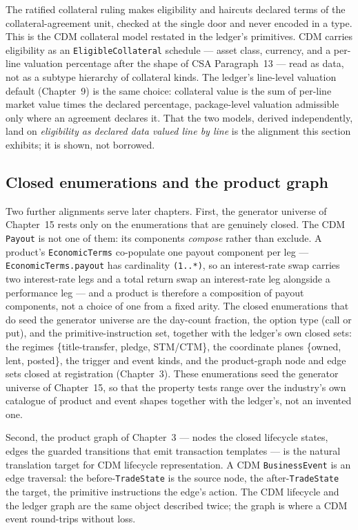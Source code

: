 The ratified collateral ruling makes eligibility and haircuts declared terms of
the collateral-agreement unit, checked at the single door and never encoded in a
type. This is the CDM collateral model restated in the ledger's primitives. CDM
carries eligibility as an \texttt{EligibleCollateral} schedule --- asset class,
currency, and a per-line valuation percentage after the shape of CSA
Paragraph~13 --- read as data, not as a subtype hierarchy of collateral kinds.
The ledger's line-level valuation default (Chapter~9) is the same choice:
collateral value is the sum of per-line market value times the declared
percentage, package-level valuation admissible only where an agreement declares
it. That the two models, derived independently, land on \emph{eligibility as
declared data valued line by line} is the alignment this section exhibits; it is
shown, not borrowed.

\subsection{Closed enumerations and the product graph}

Two further alignments serve later chapters. First, the generator universe of
Chapter~15 rests only on the enumerations that are genuinely closed. The CDM
\texttt{Payout} is not one of them: its components \emph{compose} rather than
exclude. A product's \texttt{EconomicTerms} co-populate one payout component per
leg --- \texttt{EconomicTerms.payout} has cardinality \texttt{(1..*)}, so an
interest-rate swap carries two interest-rate legs and a total return swap an
interest-rate leg alongside a performance leg --- and a product is therefore a
composition of payout components, not a choice of one from a fixed arity. The
closed enumerations that do seed the generator universe are the day-count
fraction, the option type (call or put), and the primitive-instruction set,
together with the ledger's own closed sets: the regimes \{title-transfer,
pledge, STM/CTM\}, the coordinate planes \{owned, lent, posted\}, the trigger and
event kinds, and the product-graph node and edge sets closed at registration
(Chapter~3). These enumerations seed the generator universe of Chapter~15, so
that the property tests range over the industry's own catalogue of product and
event shapes together with the ledger's, not an invented one.

Second, the product graph of Chapter~3 --- nodes the closed lifecycle states,
edges the guarded transitions that emit transaction templates --- is the natural
translation target for CDM lifecycle representation. A CDM \texttt{BusinessEvent}
is an edge traversal: the before-\texttt{TradeState} is the source node, the
after-\texttt{TradeState} the target, the primitive instructions the edge's
action. The CDM lifecycle and the ledger graph are the same object described
twice; the graph is where a CDM event round-trips without loss.


